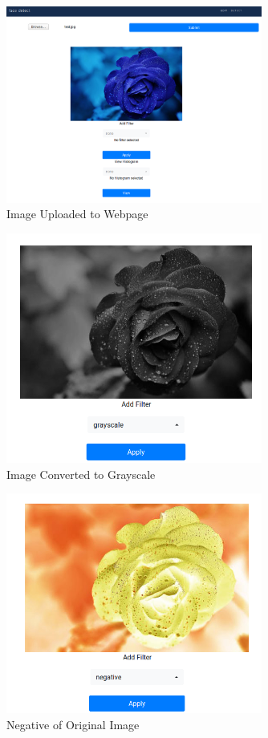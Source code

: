 \documentclass{article}
\begin{document}
  \begin{figure}[!htb]
    \centering
    \includegraphics[width=0.75\textwidth]{assets/image_uploaded.png}
    \caption{Image Uploaded to Webpage}
    \label{fig:image-uploaded}
  \end{figure}

  \begin{figure}[!htb]
    \centering
    \includegraphics[width=0.75\textwidth]{assets/grayscale.png}
    \caption{Image Converted to Grayscale}
    \label{fig:grayscale}
  \end{figure}

  \begin{figure}[!htb]
    \centering
    \includegraphics[width=0.75\textwidth]{assets/negative.png}
    \caption{Negative of Original Image}
    \label{fig:negative}
  \end{figure}
\end{document}
